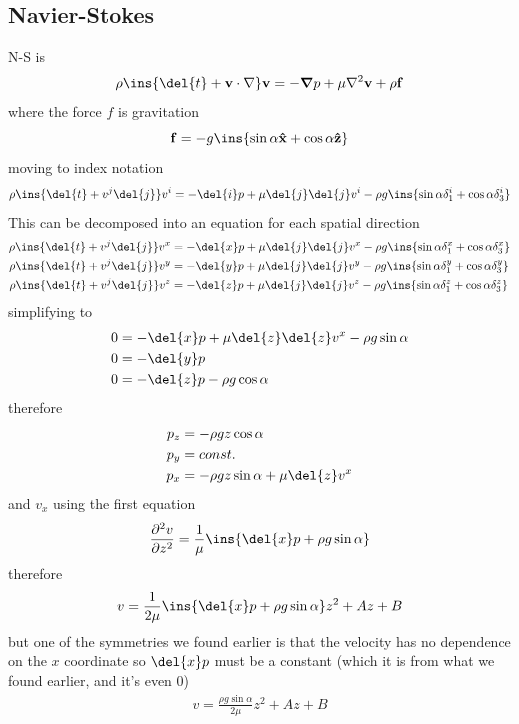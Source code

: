 \subsection{Navier-Stokes}
N-S is
\begin{equation}
    \rho\ins{\del{t}+\vb{v}\cdot\nabla}\vb{v} = -\grad{p}+\mu\laplacian{\vb{v}}+\rho\vb{f}
\end{equation}
where the force \(f\) is gravitation
\begin{equation}
    \vb{f} = -g\ins{\sin\alpha\vu{x}+\cos\alpha\vu{z}}
\end{equation}
moving to index notation
\begin{equation}
    \rho\ins{\del{t}+v^j\del{j}}v^i = -\del{i}p+\mu\del{j}\del{j}v^i - \rho g \ins{\sin\alpha\delta^i_1+\cos\alpha\delta^i_3}
\end{equation}
This can be decomposed into an equation for each spatial direction
\begin{align}
    \rho\ins{\del{t}+v^j\del{j}}v^x &= -\del{x}p+\mu\del{j}\del{j}v^x - \rho g \ins{\sin\alpha\delta^x_1+\cos\alpha\delta^x_3} \\
    \rho\ins{\del{t}+v^j\del{j}}v^y &= -\del{y}p+\mu\del{j}\del{j}v^y - \rho g \ins{\sin\alpha\delta^y_1+\cos\alpha\delta^y_3} \\
    \rho\ins{\del{t}+v^j\del{j}}v^z &= -\del{z}p+\mu\del{j}\del{j}v^z - \rho g \ins{\sin\alpha\delta^z_1+\cos\alpha\delta^z_3} 
\end{align}
simplifying to
\begin{align}
    0 &= -\del{x}p+\mu\del{z}\del{z}v^x - \rho g \sin\alpha \\
    0 &= -\del{y}p \\
    0 &= -\del{z}p - \rho g \cos\alpha
\end{align}
therefore
\begin{align}
    p_z &= -\rho gz \cos\alpha \\
    p_y &= const.\\
    p_x &= -\rho g z \sin\alpha + \mu\del{z}v^x
\end{align}
and \(v_x\) using the first equation
\begin{equation}
    \pdv[2]{v}{z} = \frac{1}{\mu}\ins{\del{x}p+\rho g \sin\alpha}
\end{equation}
therefore
\begin{equation}
    v = \frac{1}{2\mu}\ins{\del{x}p+\rho g \sin\alpha}z^2+Az+B
\end{equation}
but one of the symmetries we found earlier is that the velocity has no dependence on the \(x\) coordinate so \(\del{x}p\) must be a constant (which it is from what we found earlier, and it's even 0)
\begin{align}
    v = \frac{\rho g \sin\alpha}{2\mu} z^2+Az+B
\end{align}
